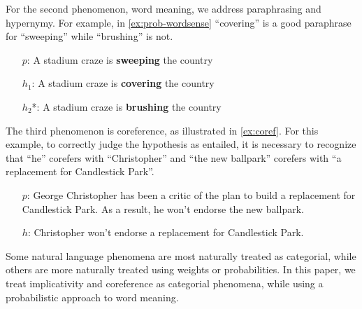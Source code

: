 For the second phenomenon, word meaning, we address paraphrasing and
hypernymy.  For example, in \eqref{ex:prob-wordsense} ``covering'' is a good
paraphrase for ``sweeping'' while ``brushing'' is not.

\begin{example}\label{ex:prob-wordsense}
\begin{itemize}
  \item[$p$:]   A stadium craze is \textbf{sweeping} the country
  \item[$h_1$:] A stadium craze is \textbf{covering} the country
  \item[$h_2$*:] A stadium craze is \textbf{brushing} the country
\end{itemize}
\end{example}

The third phenomenon is coreference, as illustrated in \eqref{ex:coref}.  For
this example, to correctly judge the hypothesis as entailed, it is necessary
to recognize that ``he'' corefers with ``Christopher'' and ``the new ballpark''
corefers with ``a replacement for Candlestick Park''.

\begin{example}\label{ex:coref}
\begin{itemize}
  \item[$p$:] George Christopher has been a critic of the plan to build a
  replacement for Candlestick Park. As a result, he won't endorse the new ballpark.
  \item[$h$:] Christopher won't endorse a replacement for Candlestick Park.
\end{itemize}
\end{example}

Some natural language phenomena are most naturally treated as categorial, while 
others are more naturally treated using weights or 
probabilities. In this paper, we treat implicativity and coreference
as categorial phenomena, while using a probabilistic approach to word
meaning. 


